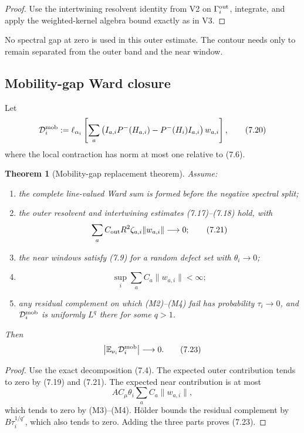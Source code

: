 \documentclass[11pt]{article}
\newtheorem{theorem}{Theorem}[section]
\begin{document}
\begin{proof}
Use the intertwining resolvent identity from V2 on
\(\Gamma_i^{\rm out}\), integrate, and apply the weighted-kernel algebra
bound exactly as in V3.
\end{proof}

No spectral gap at zero is used in this outer estimate.  The contour needs
only to remain separated from the outer band and the near window.

\subsection{Mobility-gap Ward closure}

Let
\[
 \mathcal D_i^{\rm mob}
 :=
 \ell_{\alpha_i}\left[
 \sum_a
 \left(
 I_{a,i}P^-(H_{a,i})-P^-(H_i)I_{a,i}
 \right)w_{a,i}
 \right],
 \tag{7.20}
\]
where the local contraction has norm at most one relative to (7.6).

\begin{theorem}[Mobility-gap replacement theorem]
\label{thm:v11v7-mobility}
Assume:
\begin{enumerate}[label=\textnormal{(M\arabic*)}]
\item the complete line-valued Ward sum is formed before the negative
spectral split;
\item the outer resolvent and intertwining estimates
(7.17)--(7.18) hold, with
\[
 \sum_a C_{\rm out}R^2\zeta_{a,i}\|w_{a,i}\|
 \longrightarrow0;
 \tag{7.21}
\]
\item the near windows satisfy (7.9) for a random defect set with
\(\theta_i\to0\);
\item
\[
 \sup_i\sum_a C_a\|w_{a,i}\|<\infty;
 \tag{7.22}
\]
\item any residual complement on which (M2)--(M4) fail has probability
\(\tau_i\to0\), and \(\mathcal D_i^{\rm mob}\) is uniformly \(L^q\) there
for some \(q>1\).
\end{enumerate}
Then
\[
 \left|\mathbb E_{\nu_i}\mathcal D_i^{\rm mob}\right|
 \longrightarrow0.
 \tag{7.23}
\]
\end{theorem}

\begin{proof}
Use the exact decomposition (7.4).  The expected outer contribution tends
to zero by (7.19) and (7.21).  The expected near contribution is at most
\[
 AC_\mu\theta_i\sum_a C_a\|w_{a,i}\|,
\]
which tends to zero by (M3)--(M4).  H\"older bounds the residual complement
by \(B\tau_i^{1/q'}\), which also tends to zero.  Adding the three parts
proves (7.23).
\end{proof}
\end{document}
